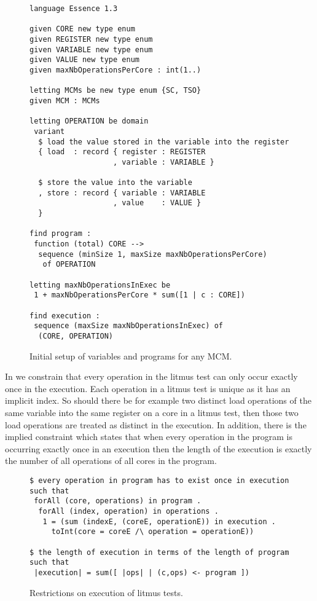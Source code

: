 \documentclass[runningheads]{llncs}
\begin{document}
\begin{figure}
\begin{lstlisting}
language Essence 1.3

given CORE new type enum
given REGISTER new type enum
given VARIABLE new type enum
given VALUE new type enum
given maxNbOperationsPerCore : int(1..)

letting MCMs be new type enum {SC, TSO}
given MCM : MCMs

letting OPERATION be domain
 variant
  $ load the value stored in the variable into the register
  { load  : record { register : REGISTER
                   , variable : VARIABLE }

  $ store the value into the variable
  , store : record { variable : VARIABLE
                   , value    : VALUE }
  }

find program :
 function (total) CORE -->
  sequence (minSize 1, maxSize maxNbOperationsPerCore)
   of OPERATION

letting maxNbOperationsInExec be
 1 + maxNbOperationsPerCore * sum([1 | c : CORE])

find execution :
 sequence (maxSize maxNbOperationsInExec) of
  (CORE, OPERATION)
\end{lstlisting}
\caption{Initial setup of variables and programs for any MCM.\label{fig:essence1}}
\end{figure}


In  we constrain that every operation in the litmus test can only occur exactly once in the execution.
Each operation in a litmus test is unique as it has an implicit index.
So should there be for example two distinct load operations of the same variable into the same register on a core in a litmus test, then those two load operations are treated as distinct in the execution.
In addition, there is the implied constraint which states that when every operation in the program is occurring exactly once in an execution then the length of the execution is exactly the number of all operations of all cores in the program.

\begin{figure}
\begin{lstlisting}
$ every operation in program has to exist once in execution
such that
 forAll (core, operations) in program .
  forAll (index, operation) in operations .
   1 = (sum (indexE, (coreE, operationE)) in execution .
     toInt(core = coreE /\ operation = operationE))

$ the length of execution in terms of the length of program
such that
 |execution| = sum([ |ops| | (c,ops) <- program ])
\end{lstlisting}
\caption{Restrictions on execution of litmus tests.\label{fig:essence2}}
\end{figure}
\end{document}
